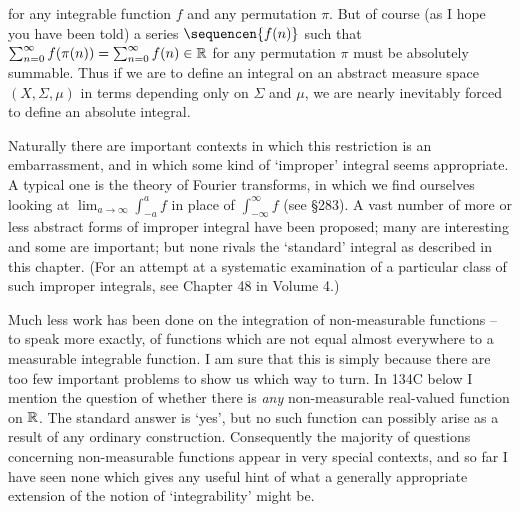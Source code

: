 {

\noindent for any integrable function $f$ and any permutation $\pi$.
But of course (as I hope you have been told) a series
$\sequencen{f(n)}$ such that
$\sum_{n=0}^{\infty}f(\pi(n))=\sum_{n=0}^{\infty}f(n)\in\Bbb R$ for
any permutation $\pi$ must be absolutely summable.   Thus if we are to
define an integral on an abstract measure space $(X,\Sigma,\mu)$ in
terms depending only on $\Sigma$ and $\mu$, we are nearly inevitably
forced to define an absolute integral.

Naturally there are important contexts in which this restriction is an
embarrassment, and in which some kind of `improper' integral seems
appropriate.   A typical one is the theory of Fourier transforms, in
which we find ourselves looking at $\lim_{a\to\infty}\int_{-a}^af$ in
place of $\int_{-\infty}^{\infty}f$ (see \S283).   A vast number of
more or less abstract forms of improper integral have been proposed;
 many are interesting and some are important;  but none rivals the
`standard'
integral as described in this chapter.   (For an attempt at a
systematic examination of a particular class of such improper
integrals, see Chapter 48 in Volume 4.)

Much less work has been done on the integration of non-measurable
functions -- to speak more exactly, of functions which are not equal
almost everywhere to a measurable integrable function.   I am sure that
this is simply because there are too few important problems to show us
which way to turn.   In 134C below I mention the question of whether
there is {\it any} non-measurable real-valued function on $\Bbb R$.
The standard answer is `yes', but no such function can possibly arise
as a result of any ordinary construction.    Consequently the
majority of
questions concerning non-measurable functions appear in very special
contexts, and so far I have seen none which gives any useful hint of
what a generally appropriate extension of the notion of
`integrability' might be.
}%

\discrpage

